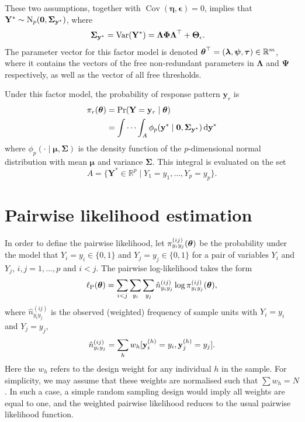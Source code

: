 \documentclass[
]{article}
\begin{document}
These two assumptions, together with
\(\operatorname{Cov}(\boldsymbol\eta, \boldsymbol\epsilon) = 0\),
implies that
\(\mathbf Y^*\sim\operatorname{N}_p(\mathbf 0,{\boldsymbol\Sigma}_{{\mathbf y}^*})\), where
\begin{align}
{\boldsymbol\Sigma}_{{\mathbf y}^*}
= \operatorname{Var}(\mathbf Y^*) 
&= \boldsymbol\Lambda\boldsymbol\Phi\boldsymbol\Lambda^\top + \boldsymbol\Theta_\epsilon.
\end{align} The parameter vector for this factor model is denoted
\(\boldsymbol\theta^\top = (\boldsymbol\lambda, \boldsymbol\psi, \boldsymbol\tau) \in\mathbb{R}^m\),
where it contains the vectors of the free non-redundant parameters in
\(\boldsymbol\Lambda\) and \(\boldsymbol \Psi\) respectively, as well as
the vector of all free thresholds.

Under this factor model, the probability of response pattern
\(\mathbf y_r\) is \begin{align}
\pi_{r}({\boldsymbol\theta})
&= \Pr(\mathbf Y = \mathbf y_r \mid \boldsymbol\theta) \\
&= \idotsint_A \phi_p(\mathbf y^* \mid \mathbf 0, \boldsymbol\Sigma_{\mathbf y^*} ) \, \text{d}\mathbf y^*
\end{align} where
\(\phi_p(\cdot \mid \boldsymbol\mu,\boldsymbol\Sigma)\) is the density
function of the \(p\)-dimensional normal distribution with mean
\(\boldsymbol\mu\) and variance \(\boldsymbol\Sigma\). This integral is
evaluated on the set \[
A = \{ \mathbf Y^* \in \mathbb R^p \mid Y_1=y_1,\dots,Y_p=y_p \}.
\]

\hypertarget{pairwise-likelihood-estimation}{%
\section{Pairwise likelihood
estimation}\label{pairwise-likelihood-estimation}}

In order to define the pairwise likelihood, let
\(\pi_{y_iy_j}^{(ij)}({\boldsymbol\theta})\) be the probability under the model that
\(Y_i=y_i \in \{0,1\}\) and \(Y_j=y_j\in\{0,1\}\) for a pair of
variables \(Y_i\) and \(Y_j\), \(i,j=1,\dots,p\) and \(i<j\). The
pairwise log-likelihood takes the form \begin{equation}
\operatorname{\ell_P}({\boldsymbol\theta}) = \sum_{i<j} \sum_{y_i}\sum_{y_j} \hat n_{y_iy_j}^{(ij)} \log \pi_{y_iy_j}^{(ij)}({\boldsymbol\theta}),
\end{equation} where \(\hat n_{y_iy_j}^{(ij)}\) is the observed
(weighted) frequency of sample units with \(Y_i=y_i\) and \(Y_j=y_j\),
\[
\hat n_{y_iy_j}^{(ij)} = \sum_h w_h [{\mathbf y}^{(h)}_i = y_i, {\mathbf y}^{(h)}_j = y_j].
\] Here the \(w_h\) refers to the design weight for any individual \(h\)
in the sample. For simplicity, we may assume that these weights are
normalised such that \(\sum w_h = N\). In such a case, a simple random
sampling design would imply all weights are equal to one, and the
weighted pairwise likelihood reduces to the usual pairwise likelihood
function.
\end{document}
